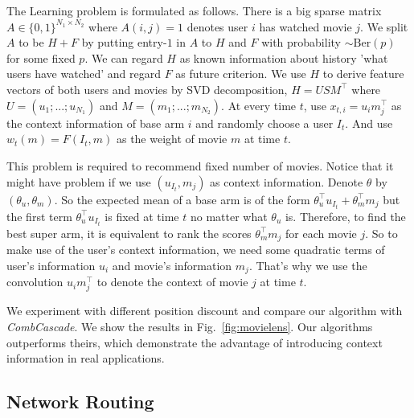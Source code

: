 \documentclass{article}
\begin{document}
The Learning problem is formulated as follows. There is a big sparse matrix $A \in \{0,1\}^{N_1 \times N_2}$ where $A(i,j) = 1$ denotes user $i$ has watched movie $j$. We split $A$ to be $H + F$ by putting entry-$1$ in $A$ to $H$ and $F$ with probability $\sim \mathrm{Ber}(p)$ for some fixed $p$. We can regard $H$ as known information about history 'what users have watched' and regard $F$ as future criterion. We use $H$ to derive feature vectors of both users and movies by SVD decomposition, $H = USM^{\top}$ where $U = (u_1; ...;u_{N_1})$ and $M = (m_1;...;m_{N_2})$. At every time $t$, use $x_{t,i} = u_{i}m_j^{\top}$ as the context information of base arm $i$ and randomly choose a user $I_t$. And use $w_t(m) = F(I_t,m)$ as the weight of movie $m$ at time $t$.

This problem is required to recommend fixed number of movies. Notice that it might have problem if we use $(u_{I_t}, m_j)$ as context information. Denote $\theta$ by $(\theta_u, \theta_m)$. So the expected mean of a base arm is of the form $\theta_u^{\top} u_{I_t} + \theta_m^{\top} m_j$ but the first term $\theta_u^{\top} u_{I_t}$ is fixed at time $t$ no matter what $\theta_u$ is. Therefore, to find the best super arm, it is equivalent to rank the scores $\theta_m^{\top} m_j$ for each movie $j$. So to make use of the user's context information, we need some quadratic terms of user's information $u_i$ and movie's information $m_j$. That's why we use the convolution $u_{i}m_j^{\top}$ to denote the context of movie $j$ at time $t$.

We experiment with different position discount and compare our algorithm with {\it CombCascade}. We show the results in Fig.~\ref{fig:movielens}. Our algorithms outperforms theirs, which demonstrate the advantage of introducing context information in real applications.

\subsection{Network Routing}
\end{document}

